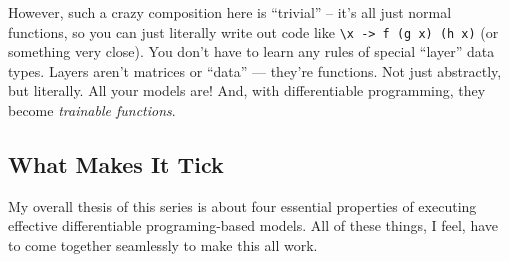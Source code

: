\documentclass[]{article}
\begin{document}
However, such a crazy composition here is ``trivial'' -- it's all just normal
functions, so you can just literally write out code like
\texttt{\textbackslash{}x\ -\textgreater{}\ f\ (g\ x)\ (h\ x)} (or something
very close). You don't have to learn any rules of special ``layer'' data types.
Layers aren't matrices or ``data'' --- they're functions. Not just abstractly,
but literally. All your models are! And, with differentiable programming, they
become \emph{trainable functions}.

\hypertarget{what-makes-it-tick}{%
\subsection{What Makes It Tick}\label{what-makes-it-tick}}

My overall thesis of this series is about four essential properties of executing
effective differentiable programing-based models. All of these things, I feel,
have to come together seamlessly to make this all work.
\end{document}
